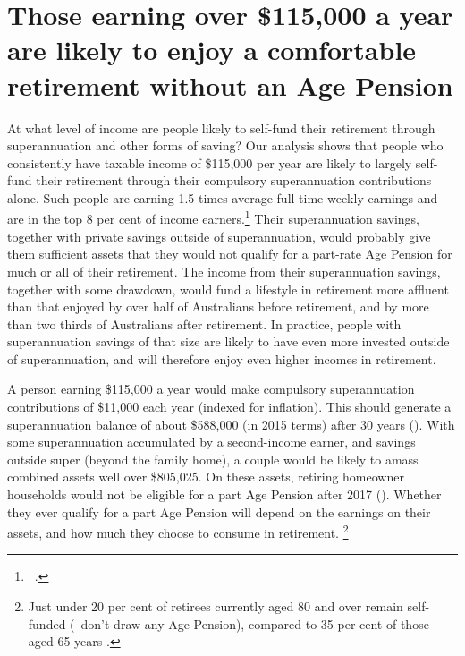 \section{Those earning over \$115,000 a year are likely to enjoy a comfortable retirement without an Age Pension}\label{sec:SUPER-3-3}
At what level of income are people likely to self-fund their retirement through superannuation and other forms of saving? Our analysis shows that people who consistently have taxable income of \$115,000 per year are likely to largely self-fund their retirement through their compulsory superannuation contributions alone. Such people are earning 1.5 times average full time weekly earnings and are in the top 8 per cent of income earners.\footnote{\gao\ \textcites{ATO2015SampleFile1213}{ABS2013AWE}.} Their superannuation savings, together with private savings outside of superannuation, would probably give them sufficient assets that they would not qualify for a part-rate Age Pension for much or all of their retirement. The income from their superannuation savings, together with some drawdown, would fund a lifestyle in retirement more affluent than that enjoyed by over half of Australians before retirement, and by more than two thirds of Australians after retirement. In practice, people with superannuation savings of that size are likely to have even more invested outside of superannuation, and will therefore enjoy even higher incomes in retirement.

A person earning \$115,000 a year would make compulsory superannuation contributions of \$11,000 each year (indexed for inflation). This should generate a superannuation balance of about \$588,000 (in 2015 terms\DEVIATION{}) after 30 years (). With some superannuation accumulated by a second-income earner, and savings outside super (beyond the family home), a couple would be likely to amass combined assets well over \$805,025. On these assets, retiring homeowner households would not be eligible for a part Age Pension after 2017 (). Whether they ever qualify for a part Age Pension will depend on the earnings on their assets, and how much they choose to consume in retirement.%
\footnote{Just under 20 per cent of retirees currently aged 80 and over remain self-funded (\ie~don’t draw any Age Pension), compared to 35 per cent of those aged 65 years 
\textcite[][47]{ActuariesInstitute2015RetirementIncomes}.} 

